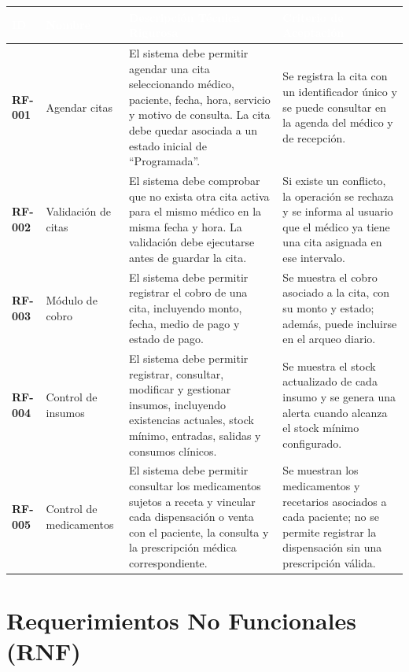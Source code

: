 \small
\begin{longtable}{>{\bfseries}p{}p{}p{}p{}}
\toprule
\rowcolor{azulprincipal}\textcolor{white}{ID} & \textcolor{white}{Nombre} & \textcolor{white}{Descripción Técnica Rigurosa} & \textcolor{white}{Criterio de Aceptación}\\
\midrule
RF-001 & Agendar citas & El sistema debe permitir agendar una cita seleccionando médico, paciente, fecha, hora, servicio y motivo de consulta. La cita debe quedar asociada a un estado inicial de ``Programada''. & Se registra la cita con un identificador único y se puede consultar en la agenda del médico y de recepción.\\
RF-002 & Validación de citas & El sistema debe comprobar que no exista otra cita activa para el mismo médico en la misma fecha y hora. La validación debe ejecutarse antes de guardar la cita. & Si existe un conflicto, la operación se rechaza y se informa al usuario que el médico ya tiene una cita asignada en ese intervalo.\\
RF-003 & Módulo de cobro & El sistema debe permitir registrar el cobro de una cita, incluyendo monto, fecha, medio de pago y estado de pago. & Se muestra el cobro asociado a la cita, con su monto y estado; además, puede incluirse en el arqueo diario.\\
RF-004 & Control de insumos & El sistema debe permitir registrar, consultar, modificar y gestionar insumos, incluyendo existencias actuales, stock mínimo, entradas, salidas y consumos clínicos. & Se muestra el stock actualizado de cada insumo y se genera una alerta cuando alcanza el stock mínimo configurado.\\
RF-005 & Control de medicamentos & El sistema debe permitir consultar los medicamentos sujetos a receta y vincular cada dispensación o venta con el paciente, la consulta y la prescripción médica correspondiente. & Se muestran los medicamentos y recetarios asociados a cada paciente; no se permite registrar la dispensación sin una prescripción válida.\\
\bottomrule
\end{longtable}
\normalsize

\section{Requerimientos No Funcionales (RNF)}

